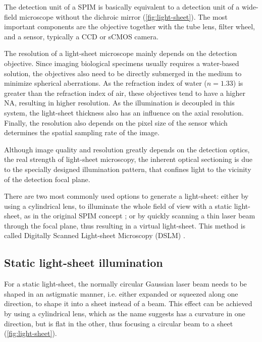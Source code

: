     The detection unit of a SPIM is basically equivalent to a detection unit of a wide-field microscope without the dichroic mirror (\autoref{fig:light-sheet}). The most important components are the objective together with the tube lens, filter wheel, and a sensor, typically a CCD or sCMOS camera.
    
    The resolution of a light-sheet microscope mainly depends on the detection objective.
    Since imaging biological specimens usually requires a water-based solution, the objectives also need to be directly submerged in the medium to minimize spherical aberrations. As the refraction index of water ($n=1.33$) is greater than the refraction index of air, these objectives tend to have a higher NA, resulting in higher resolution. As the illumination is decoupled in this system, the light-sheet thickness also has an influence on the axial resolution. Finally, the resolution also depends on the pixel size of the sensor which determines the spatial sampling rate of the image.

    Although image quality and resolution greatly depends on the detection optics, the real strength of light-sheet microscopy, the inherent optical sectioning is due to the specially designed illumination pattern, that confines light to the vicinity of the detection focal plane.

    There are two most commonly used options to generate a light-sheet: either by using a cylindrical lens, to illuminate the whole field of view with a static light-sheet, as in the original SPIM concept \cite{huisken_optical_2004}; or by quickly scanning a thin laser beam through the focal plane, thus resulting in a virtual light-sheet. This method is called Digitally Scanned Light-sheet Microscopy (DSLM) \cite{keller_reconstruction_2008}.



  \subsection{Static light-sheet illumination}
    For a static light-sheet, the normally circular Gaussian laser beam needs to be shaped in an astigmatic manner, i.e. either expanded or squeezed along one direction, to shape it into a sheet instead of a beam. This effect can be achieved by using a cylindrical lens, which as the name suggests has a curvature in one direction, but is flat in the other, thus focusing a circular beam to a sheet (\autoref{fig:light-sheet}).
    
